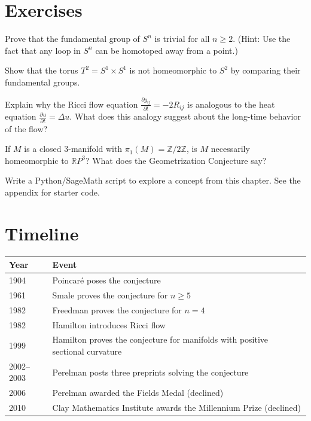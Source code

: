 \section{Exercises}

\begin{exercise}[Basic]
Prove that the fundamental group of $S^n$ is trivial for all $n \geq 2$. (Hint: Use the fact that any loop in $S^n$ can be homotoped away from a point.)
\end{exercise}

\begin{exercise}[Intermediate]
Show that the torus $T^2 = S^1 \times S^1$ is not homeomorphic to $S^2$ by comparing their fundamental groups.
\end{exercise}

\begin{exercise}[Challenge]
Explain why the Ricci flow equation $\frac{\partial g_{ij}}{\partial t} = -2R_{ij}$ is analogous to the heat equation $\frac{\partial u}{\partial t} = \Delta u$. What does this analogy suggest about the long-time behavior of the flow?
\end{exercise}

\begin{exercise}
If $M$ is a closed 3-manifold with $\pi_1(M) = \mathbb{Z}/2\mathbb{Z}$, is $M$ necessarily homeomorphic to $\mathbb{R}P^3$? What does the Geometrization Conjecture say?
\end{exercise}


\begin{exercise}[Computational]
Write a Python/SageMath script to explore a concept from this chapter. See the appendix for starter code.
\end{exercise}

\section{Timeline}

\begin{tabularx}{\linewidth}{lX}
\toprule
\textbf{Year} & \textbf{Event} \\ \midrule
1904 & Poincar\'e poses the conjecture \\ 
1961 & Smale proves the conjecture for $n \geq 5$ \cite{smale1961} \\ 
1982 & Freedman proves the conjecture for $n = 4$ \cite{freedman1982} \\ 
1982 & Hamilton introduces Ricci flow \cite{hamilton1982} \\ 
1999 & Hamilton proves the conjecture for manifolds with positive sectional curvature \\ 
2002--2003 & Perelman posts three preprints solving the conjecture \cite{perelman2002,perelman2003a,perelman2003b} \\ 
2006 & Perelman awarded the Fields Medal (declined) \\ 
2010 & Clay Mathematics Institute awards the Millennium Prize (declined) \\ \bottomrule
\end{tabularx}

